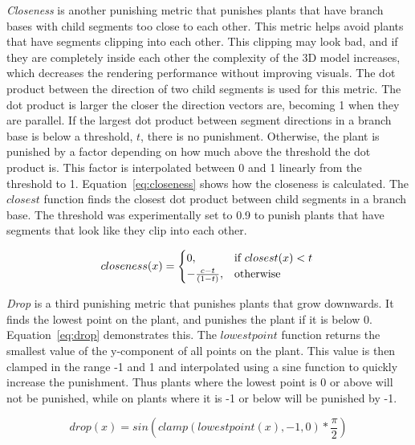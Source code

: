\textit{Closeness} is another punishing metric that punishes plants that have branch bases with child segments too close to each other.
This metric helps avoid plants that have segments clipping into each other.
This clipping may look bad, and if they are completely inside each other the complexity of the 3D model increases, which decreases the rendering performance without improving visuals.
The dot product between the direction of two child segments is used for this metric.
The dot product is larger the closer the direction vectors are, becoming 1 when they are parallel.
If the largest dot product between segment directions in a branch base is below a threshold, $t$, there is no punishment.
Otherwise, the plant is punished by a factor depending on how much above the threshold the dot product is.
This factor is interpolated between 0 and 1 linearly from the threshold to 1.
Equation~\ref{eq:closeness} shows how the closeness is calculated.
The $closest$ function finds the closest dot product between child segments in a branch base.
The threshold was experimentally set to 0.9 to punish plants that have segments that look like they clip into each other.

\begin{equation}
\label{eq:closeness}
    closeness(x) =
    \begin{cases}
        0,& \text{if } closest(x) < t \\
        -\frac{c - t}{(1 - t)},& \text{otherwise}
    \end{cases} \\
\end{equation}

\textit{Drop} is a third punishing metric that punishes plants that grow downwards.
It finds the lowest point on the plant, and punishes the plant if it is below 0.
Equation~\ref{eq:drop} demonstrates this.
The $lowestpoint$ function returns the smallest value of the y-component of all points on the plant.
This value is then clamped in the range -1 and 1 and interpolated using a sine function to quickly increase the punishment.
Thus plants where the lowest point is 0 or above will not be punished, while on plants where it is -1 or below will be punished by -1.

\begin{equation}
\label{eq:drop}
drop(x) = sin(clamp(lowestpoint(x), -1, 0) * \frac{\pi}{2})
\end{equation}

